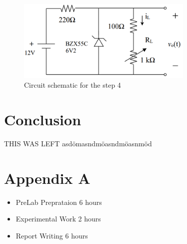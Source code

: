 \documentclass[letterpaper,12pt]{article}
\begin{document}
\begin{figure}[H]
    \centering
    \includegraphics[width = 0.75\textwidth]{4_1.png}
    \caption{Circuit schematic for the step 4}
\end{figure} 
    
    
\section{Conclusion}

THIS WAS LEFT asdömasndmöasndmöasnmöd

\section*{Appendix A}
\begin{itemize}
    \item PreLab Preprataion 6 hours
    \item Experimental Work 2  hours
    \item Report Writing 6 hours
\end{itemize}
\end{document}
